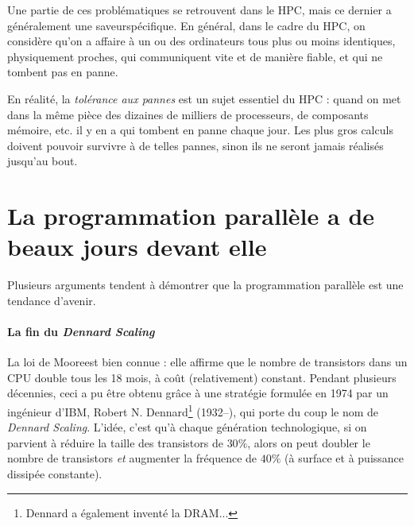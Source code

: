 Une partie de ces problématiques se retrouvent dans le HPC, mais ce dernier a
généralement une \og saveur\fg spécifique. En général, dans le cadre du HPC, on
considère qu'on a affaire à un ou des ordinateurs tous plus ou moins identiques,
physiquement proches, qui communiquent vite et de manière fiable, et qui ne
tombent pas en panne.

\begin{danger}
  En réalité, la \emph{tolérance aux pannes} est un sujet essentiel du HPC :
  quand on met dans la même pièce des dizaines de milliers de processeurs, de
  composants mémoire, etc. il y en a qui tombent en panne chaque jour. Les plus
  gros calculs doivent pouvoir survivre à de telles pannes, sinon ils ne seront
  jamais réalisés jusqu'au bout.
\end{danger}

\section{La programmation parallèle a de beaux jours devant elle}

Plusieurs arguments tendent à démontrer que la programmation parallèle est une
tendance d'avenir.

\paragraph{La fin du \og \emph{Dennard Scaling}\fg} La \og loi de Moore\fg est
bien connue : elle affirme que le nombre de transistors dans un CPU double tous
les 18 mois, à coût (relativement) constant. Pendant plusieurs décennies, ceci a
pu être obtenu grâce à une stratégie formulée en 1974 par un ingénieur d'IBM,
Robert N. Dennard\footnote{Dennard a également inventé la DRAM...} (1932--), qui
porte du coup le nom de \og \emph{Dennard Scaling}\fg. L'idée, c'est qu'à chaque
génération technologique, si on parvient à réduire la taille des transistors de
$30\%$, alors on peut doubler le nombre de transistors \emph{et} augmenter la
fréquence de $40\%$ (à surface et à puissance dissipée constante).

